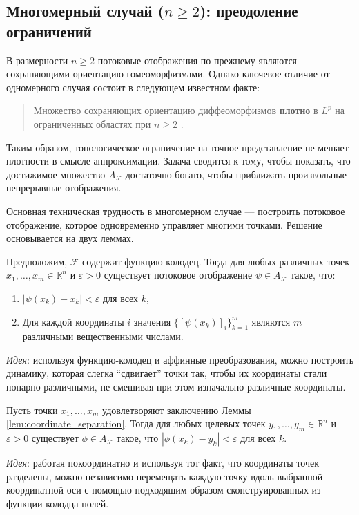 \documentclass[../NDCNNAI_main.tex]{subfiles}
\begin{document}
\subsection{Многомерный случай ($n \geq 2$): преодоление ограничений}
В размерности $n \geq 2$ потоковые отображения по-прежнему являются сохраняющими ориентацию гомеоморфизмами. Однако ключевое отличие от одномерного случая состоит в следующем известном факте:
\begin{quote}
Множество сохраняющих ориентацию диффеоморфизмов \textbf{плотно} в $L^p$ на ограниченных областях при $n \geq 2$ \cite{Brenier2003LpApproximation}.
\end{quote}
Таким образом, топологическое ограничение на точное представление не мешает плотности в смысле аппроксимации. Задача сводится к тому, чтобы показать, что достижимое множество $A_{\mathcal{F}}$ достаточно богато, чтобы приближать произвольные непрерывные отображения.

Основная техническая трудность в многомерном случае --- построить потоковое отображение, которое одновременно управляет многими точками. Решение основывается на двух леммах.

\begin{lemma}
\label{lem:coordinate_separation}
Предположим, $\mathcal{F}$ содержит функцию-колодец. Тогда для любых различных точек $x_1, \ldots, x_m \in \mathbb{R}^n$ и $\varepsilon > 0$ существует потоковое отображение $\psi \in A_{\mathcal{F}}$ такое, что:
\begin{enumerate}
    \item $|\psi(x_k) - x_k| < \varepsilon$ для всех $k$,
    \item Для каждой координаты $i$ значения $\{ [\psi(x_k)]_i \}_{k=1}^m$ являются $m$ различными вещественными числами.
\end{enumerate}
\end{lemma}
\textit{Идея}: используя функцию-колодец и аффинные преобразования, можно построить динамику, которая слегка ``сдвигает'' точки так, чтобы их координаты стали попарно различными, не смешивая при этом изначально различные координаты.

\begin{lemma}
\label{lem:pointwise_steering}
Пусть точки $x_1, \ldots, x_m$ удовлетворяют заключению Леммы \ref{lem:coordinate_separation}. Тогда для любых целевых точек $y_1, \ldots, y_m \in \mathbb{R}^n$ и $\varepsilon > 0$ существует $\phi \in A_{\mathcal{F}}$ такое, что $|\phi(x_k) - y_k| < \varepsilon$ для всех $k$.
\end{lemma}
\textit{Идея}: работая покоординатно и используя тот факт, что координаты точек разделены, можно независимо перемещать каждую точку вдоль выбранной координатной оси с помощью подходящим образом сконструированных из функции-колодца полей.
\end{document}

